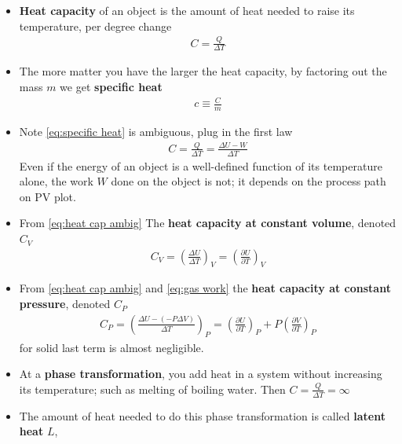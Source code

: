 \documentclass{book}
\begin{document}
\begin{itemize}
	\item \textbf{Heat capacity} of an object is the amount of heat needed to raise its temperature,
	      per degree change
	      \begin{align}
		      \label{eq:heat capacity}
		      C = \frac{Q}{\Delta{T}}
	      \end{align}
	\item The more matter you have the larger the heat capacity, by factoring out the mass $m$
	      we get \textbf{specific heat}
	      \begin{align}
		      \label{eq:specific heat}
		      c \equiv \frac{C}{m}
	      \end{align}
	\item Note \eqref{eq:specific heat} is ambiguous, plug in the first law
	      \begin{align}
		      \label{eq:heat cap ambig}
		      C = \frac{Q}{\Delta{T}} = \frac{\Delta{U} - W}{\Delta{T}}
	      \end{align}
	      Even if the energy of an object is a well-defined function of its temperature alone,
	      the work $W$ done on the object is not; it depends on the process path on PV plot.
	\item From \eqref{eq:heat cap ambig} The \textbf{heat capacity at constant volume}, denoted $C_{V}$
	      \begin{align}
		      \label{eq:heat cap v}
		      C_{V} = {\left( \frac{\Delta{U}}{\Delta{T}} \right)}_{V} =
		      \left( \frac{\partial U}{\partial T} \right)_{V}
	      \end{align}
	\item From \eqref{eq:heat cap ambig} and \eqref{eq:gas work}
	      the \textbf{heat capacity at constant pressure}, denoted $C_{P}$
	      \begin{align}
		      \label{eq:heat cap p}
		      C_{P} = \left( \frac{\Delta{U} - (- P \Delta{V})}{\Delta{T}}  \right)_{P}
		      = \left ( \frac{\partial U}{\partial T}  \right)_{P}
		      + P \left ( \frac{\partial V}{\partial T}  \right)_{P}
	      \end{align}
	      for solid last term is almost negligible.
	\item At a \textbf{phase transformation}, you add heat in a system without increasing its temperature;
	      such as melting of boiling water. Then $C = \frac{Q}{\Delta{T}} = \infty$
	\item The amount of heat needed to do this phase transformation is called \textbf{latent heat} $L$,

\end{itemize}
\end{document}
